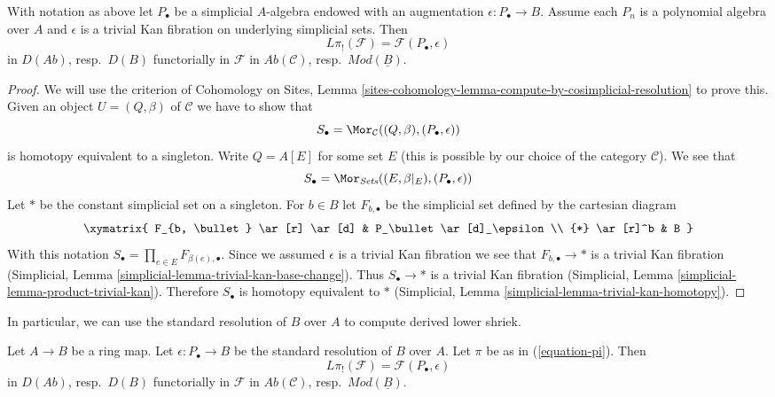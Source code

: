 \begin{lemma}
\label{lemma-identify-pi-shriek}
With notation as above let $P_\bullet$ be a simplicial $A$-algebra
endowed with an augmentation $\epsilon : P_\bullet \to B$.
Assume each $P_n$ is a polynomial algebra over $A$ and $\epsilon$
is a trivial Kan fibration on underlying simplicial sets. Then
$$
L\pi_!(\mathcal{F}) = \mathcal{F}(P_\bullet, \epsilon)
$$
in $D(\textit{Ab})$, resp.\ $D(B)$ functorially in $\mathcal{F}$ in
$\textit{Ab}(\mathcal{C})$, resp.\ $\textit{Mod}(\underline{B})$.
\end{lemma}

\begin{proof}
We will use the criterion of Cohomology on Sites, Lemma
\ref{sites-cohomology-lemma-compute-by-cosimplicial-resolution} to prove this.
Given an object $U = (Q, \beta)$ of $\mathcal{C}$ we have to show that
$$
S_\bullet = \Mor_\mathcal{C}((Q, \beta), (P_\bullet, \epsilon))
$$
is homotopy equivalent to a singleton.
Write $Q = A[E]$ for some set $E$ (this is possible by our choice of
the category $\mathcal{C}$). We see that
$$
S_\bullet = \Mor_{\textit{Sets}}((E, \beta|_E), (P_\bullet, \epsilon))
$$
Let $*$ be the constant simplicial set on a singleton. For $b \in B$
let $F_{b, \bullet}$ be the simplicial set defined by the cartesian
diagram
$$
\xymatrix{
F_{b, \bullet} \ar[r] \ar[d] & P_\bullet \ar[d]_\epsilon \\
{*} \ar[r]^b & B
}
$$
With this notation $S_\bullet = \prod_{e \in E} F_{\beta(e), \bullet}$.
Since we assumed $\epsilon$ is a trivial Kan fibration we see that
$F_{b, \bullet} \to *$ is a trivial Kan fibration
(Simplicial, Lemma \ref{simplicial-lemma-trivial-kan-base-change}).
Thus $S_\bullet \to *$ is a trivial Kan fibration
(Simplicial, Lemma \ref{simplicial-lemma-product-trivial-kan}).
Therefore $S_\bullet$ is homotopy equivalent to $*$
(Simplicial, Lemma \ref{simplicial-lemma-trivial-kan-homotopy}).
\end{proof}

\noindent
In particular, we can use the standard resolution of $B$ over $A$
to compute derived lower shriek.

\begin{lemma}
\label{lemma-pi-shriek-standard}
Let $A \to B$ be a ring map. Let $\epsilon : P_\bullet \to B$
be the standard resolution of $B$ over $A$. Let $\pi$ be as in
(\ref{equation-pi}). Then
$$
L\pi_!(\mathcal{F}) = \mathcal{F}(P_\bullet, \epsilon)
$$
in $D(\textit{Ab})$, resp.\ $D(B)$ functorially in $\mathcal{F}$ in
$\textit{Ab}(\mathcal{C})$, resp.\ $\textit{Mod}(\underline{B})$.
\end{lemma}

